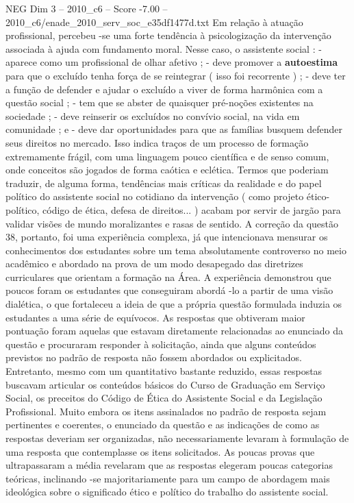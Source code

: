 \begin{textsample}{NEG Dim 3 – 2010\_c6 – Score -7.00 – 2010\_c6/enade\_2010\_serv\_soc\_e35df1477d.txt}
Em relação à atuação profissional, percebeu -se uma forte tendência à psicologização da intervenção associada à ajuda com fundamento moral.
Nesse caso, o assistente social : - aparece como um profissional de olhar afetivo ; - deve promover a \textbf{autoestima} para que o excluído tenha força de se reintegrar ( isso foi recorrente ) ; - deve ter a função de defender e ajudar o excluído a viver de forma harmônica com a questão social ; - tem que se abster de quaisquer pré-noções existentes na sociedade ; - deve reinserir os excluídos no convívio social, na vida em comunidade ; e - deve dar oportunidades para que as famílias busquem defender seus direitos no mercado.
Isso indica traços de um processo de formação extremamente frágil, com uma linguagem pouco científica e de senso comum, onde conceitos são jogados de forma caótica e eclética.
Termos que poderiam traduzir, de alguma forma, tendências mais críticas da realidade e do papel político do assistente social no cotidiano da intervenção ( como projeto ético-político, código de ética, defesa de direitos... ) acabam por servir de jargão para validar visões de mundo moralizantes e rasas de sentido.
A correção da questão 38, portanto, foi uma experiência complexa, já que intencionava mensurar os conhecimentos dos estudantes sobre um tema absolutamente controverso no meio acadêmico e abordado na prova de um modo desapegado das diretrizes curriculares que orientam a formação na Área.
A experiência demonstrou que poucos foram os estudantes que conseguiram abordá -lo a partir de uma visão dialética, o que fortaleceu a ideia de que a própria questão formulada induzia os estudantes a uma série de equívocos.
As respostas que obtiveram maior pontuação foram aquelas que estavam diretamente relacionadas ao enunciado da questão e procuraram responder à solicitação, ainda que alguns conteúdos previstos no padrão de resposta não fossem abordados ou explicitados.
Entretanto, mesmo com um quantitativo bastante reduzido, essas respostas buscavam articular os conteúdos básicos do Curso de Graduação em Serviço Social, os preceitos do Código de Ética do Assistente Social e da Legislação Profissional.
Muito embora os itens assinalados no padrão de resposta sejam pertinentes e coerentes, o enunciado da questão e as indicações de como as respostas deveriam ser organizadas, não necessariamente levaram à formulação de uma resposta que contemplasse os itens solicitados.
As poucas provas que ultrapassaram a média revelaram que as respostas elegeram poucas categorias teóricas, inclinando -se majoritariamente para um campo de abordagem mais ideológica sobre o significado ético e político do trabalho do assistente social.

\end{textsample}
